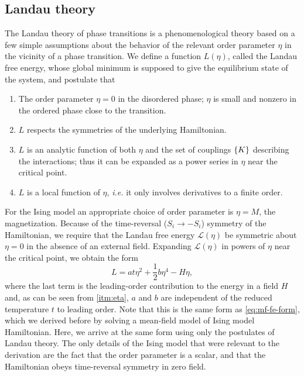 \subsection{Landau theory}

The Landau theory of phase transitions is a phenomenological theory based on
a few simple assumptions about the behavior of the relevant order parameter
$\eta$ in the vicinity of a phase transition. We define a function $L(\eta)$,
called the Landau free energy, whose global minimum is supposed to give the
equilibrium state of the system, and postulate that
\begin{enumerate}
  \item The order parameter $\eta=0$ in the disordered phase; $\eta$ is small
    and nonzero in the ordered phase close to the transition.
    \label{itm:eta}
  \item $L$ respects the symmetries of the underlying Hamiltonian.
  \item $L$ is an analytic function of both $\eta$ and the set of couplings
    $\cbr{K}$ describing the interactions; thus it can be expanded as a power
    series in $\eta$ near the critical point.
  \item $L$ is a local function of $\eta$, \textit{i.e.} it only involves
    derivatives to a finite order.
\end{enumerate}

For the Ising model an appropriate choice of order parameter is $\eta=M$, the
magnetization. Because of the time-reversal ($S_i \to -S_i$) symmetry of the
Hamiltonian, we require that the Landau free energy $\mathcal{L}(\eta)$ be
symmetric about $\eta=0$ in the absence of an external field. Expanding
$\mathcal{L}(\eta)$ in powers of $\eta$ near the critical point, we obtain the
form
\begin{equation}
  L = a t \eta^2 + \frac{1}{2} b \eta^4 - H \eta,
  \label{eq:landau-fe}
\end{equation}
where the last term is the leading-order contribution to the energy in a field
$H$ and, as can be seen from \cref{itm:eta}, $a$ and $b$ are independent of the
reduced temperature $t$ to leading order. Note that this is the same form as
\cref{eq:mf-fe-form}, which we derived before by solving a mean-field model of
Ising model Hamiltonian. Here, we arrive at the same form using only the
postulates of Landau theory. The only details of the Ising model that were
relevant to the derivation are the fact that the order parameter is a scalar,
and that the Hamiltonian obeys time-reversal symmetry in zero field.

